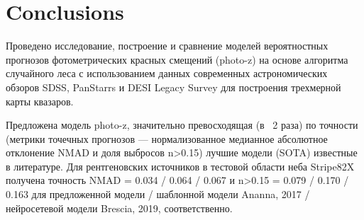 \section{Conclusions}\label{sec:results}

Проведено исследование, построение и сравнение моделей вероятностных прогнозов фотометрических красных смещений (photo-z) на основе алгоритма случайного леса  с использованием данных современных астрономических обзоров SDSS, PanStarrs и DESI Legacy Survey для построения трехмерной карты квазаров.

Предложена модель photo-z, значительно превосходящая (в ~2 раза) по точности (метрики точечных прогнозов — нормализованное медианное абсолютное отклонение NMAD и доля выбросов n>0.15) лучшие модели (SOTA) известные в литературе. Для рентгеновских источников в тестовой области неба Stripe82X получена точность NMAD = 0.034 / 0.064 / 0.067 и n>0.15 = 0.079 / 0.170 / 0.163 для предложенной модели / шаблонной модели Ananna, 2017 / нейросетевой модели Brescia, 2019, соответственно.


